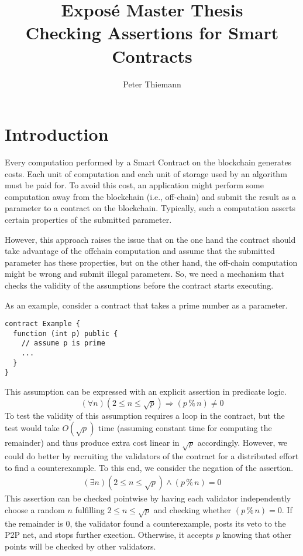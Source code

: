 \documentclass{article}
\title{Expos\'{e} Master Thesis\\
  Checking Assertions for Smart Contracts}
\author{Peter Thiemann}
\begin{document}
\maketitle{}

\section{Introduction}
\label{sec:introduction}

Every computation performed by a Smart Contract on the blockchain generates costs. Each
unit of computation and each unit of storage used by an algorithm must be paid for. To
avoid this cost, an application might perform some computation away from the blockchain
(i.e., off-chain) and submit the result as a parameter to a contract on the
blockchain. Typically, such a computation asserts certain properties of the 
submitted parameter. 

However, this approach raises the issue that on the one hand the contract should take
advantage of the offchain computation and assume that the submitted parameter has
these properties, but on the other hand, the off-chain computation might be wrong and
submit illegal parameters. So, we need a mechanism that checks the validity of the
assumptions before the contract starts executing.

As an example, consider a contract that takes a prime number as a parameter.
\begin{lstlisting}[numbers=none]
contract Example {
  function (int p) public {
    // assume p is prime
    ...
  }
}
\end{lstlisting}
This assumption can be expressed with an explicit assertion in predicate logic.
\begin{displaymath}
  (\forall n) (2 \le n \le \sqrt p) \Rightarrow (p \mathbin{\%} n) \ne 0
\end{displaymath}
To test the validity of this assumption requires a loop in the contract, but the test would take
$O(\sqrt p)$ time (assuming constant time for computing the remainder) and thus produce extra cost
linear in $\sqrt p$ accordingly. 
However, we could do better by recruiting the validators of the contract for a distributed
effort to find a counterexample. To this end, we consider the negation of the assertion.
\begin{gather}\label{eq:4}
  (\exists n) (2 \le n \le \sqrt p) \wedge (p \mathbin{\%} n) = 0
\end{gather}
This assertion can be checked pointwise by having each validator independently choose a
random $n$ fulfilling $2 \le n \le 
\sqrt p$ and checking whether $(p \mathbin{\%} n) = 0$. If the remainder is $0$, the
validator found a counterexample, posts its veto to the P2P net, and stops further
exection. Otherwise, it accepts $p$ knowing that other points will be checked by other
validators.
\end{document}
